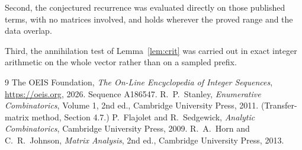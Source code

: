 \documentclass[11pt,a4paper]{article}
\theoremstyle{plain}
\theoremstyle{definition}
\begin{document}
Second, the conjectured recurrence was evaluated directly on those published terms, with no
matrices involved, and holds wherever the proved range and the data overlap.

Third, the annihilation test of Lemma~\ref{lem:crit} was carried out in exact integer
arithmetic on the whole vector rather than on a sampled prefix.

\begin{thebibliography}{9}
 The OEIS Foundation, \emph{The On-Line Encyclopedia of Integer
Sequences}, \url{https://oeis.org}, 2026. Sequence A186547.
 R.~P.~Stanley, \emph{Enumerative Combinatorics}, Volume 1, 2nd ed.,
Cambridge University Press, 2011. (Transfer-matrix method, Section 4.7.)
 P.~Flajolet and R.~Sedgewick, \emph{Analytic Combinatorics}, Cambridge
University Press, 2009.
 R.~A.~Horn and C.~R.~Johnson, \emph{Matrix Analysis}, 2nd ed., Cambridge
University Press, 2013.
\end{thebibliography}
\end{document}
